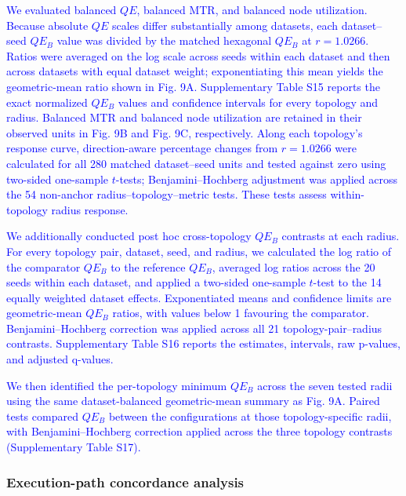 \documentclass[10pt]{article} %
\newcommand{\TrackedChange}[1]{\textcolor{blue}{#1}}
\begin{document}
\TrackedChange{We evaluated balanced $QE$, balanced MTR, and balanced node utilization.} \TrackedChange{Because absolute $QE$ scales differ substantially among datasets, each dataset--seed $QE_B$ value was divided by the matched hexagonal $QE_B$ at $r=1.0266$.} \TrackedChange{Ratios were averaged on the log scale across seeds within each dataset and then across datasets with equal dataset weight; exponentiating this mean yields the geometric-mean ratio shown in Fig. 9A.} \TrackedChange{Supplementary Table S15 reports the exact normalized $QE_B$ values and confidence intervals for every topology and radius.} \TrackedChange{Balanced MTR and balanced node utilization are retained in their observed units in Fig. 9B and Fig. 9C, respectively.} \TrackedChange{Along each topology's response curve, direction-aware percentage changes from $r=1.0266$ were calculated for all 280 matched dataset--seed units and tested against zero using two-sided one-sample $t$-tests; Benjamini--Hochberg adjustment was applied across the 54 non-anchor radius--topology--metric tests.} \TrackedChange{These tests assess within-topology radius response.}

\TrackedChange{We additionally conducted post hoc cross-topology $QE_B$ contrasts at each radius.} \TrackedChange{For every topology pair, dataset, seed, and radius, we calculated the log ratio of the comparator $QE_B$ to the reference $QE_B$, averaged log ratios across the 20 seeds within each dataset, and applied a two-sided one-sample $t$-test to the 14 equally weighted dataset effects.} \TrackedChange{Exponentiated means and confidence limits are geometric-mean $QE_B$ ratios, with values below 1 favouring the comparator.} \TrackedChange{Benjamini--Hochberg correction was applied across all 21 topology-pair--radius contrasts.} \TrackedChange{Supplementary Table S16 reports the estimates, intervals, raw p-values, and adjusted q-values.}

\TrackedChange{We then identified the per-topology minimum $QE_B$ across the seven tested radii using the same dataset-balanced geometric-mean summary as Fig. 9A.} \TrackedChange{Paired tests compared $QE_B$ between the configurations at those topology-specific radii, with Benjamini--Hochberg correction applied across the three topology contrasts (Supplementary Table S17).}

{\color{blue}\subsubsection{Execution-path concordance analysis}}
\end{document}
